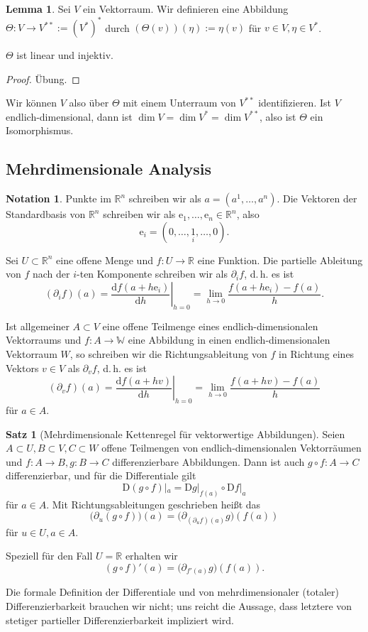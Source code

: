 \documentclass[a4paper]{scrreprt}
\numberwithin{equation}{chapter}
\newcommand{\D}{\mathrm{d}}
\newcommand{\DD}{\mathrm{D}}
\newcommand{\e}{\mathrm{e}}
\newcommand{\R}{\mathbb{R}}
\theoremstyle{definition}
\newtheorem{lemma}[defn]{Lemma}
\newtheorem{satz}[defn]{Satz}
\newtheorem{nota}[defn]{Notation}
\newcommand{\bewUeb}{\begin{proof}Übung.\end{proof}}
\begin{document}
\begin{lemma}
	Sei $V$ ein Vektorraum. Wir definieren eine Abbildung $\Theta\colon V \to V^{**} := (V^*)^*$ durch $(\Theta(v))(\eta) := \eta(v)$ für $v \in V, \eta \in V^*$.

	$\Theta$ ist linear und injektiv.

	\bewUeb
\end{lemma}
Wir können $V$ also über $\Theta$ mit einem Unterraum von $V^{**}$ identifizieren. Ist $V$ endlich-dimensional, dann ist $\dim V = \dim V^* = \dim V^{**}$, also ist $\Theta$ ein Isomorphismus.

\subsection{Mehrdimensionale Analysis}
\begin{nota}
	Punkte im $\mathbb R^n$ schreiben wir als $a = (a^1, \dots, a^n)$. Die Vektoren der Standardbasis von $\mathbb R^n$ schreiben wir als $\e_1, \dots, \e_n \in \mathbb R^n$, also \[\e_i = (0,\dots,\underset{i}{1},\dots,0).\]

	Sei $U \subset \mathbb R^n$ eine offene Menge und $f\colon U \to \mathbb R$ eine Funktion. Die partielle Ableitung von $f$ nach der $i$-ten Komponente schreiben wir als $\partial_i f$, d.\,h. es ist
	\[(\partial_i f)(a) = \left.\frac{\D f(a + h \e_i)}{\D h}\right|_{h=0} = \lim_{h\to 0} \frac{f(a + h \e_i) - f(a)}{h}.\]

	Ist allgemeiner $A \subset V$ eine offene Teilmenge eines endlich-dimensionalen Vektorraums und $f\colon A \to \mathbb W$ eine Abbildung in einen endlich-dimensionalen Vektorraum $W$, so schreiben wir die Richtungsableitung von $f$ in Richtung eines Vektors $v\in V$ als $\partial_v f$, d.\,h. es ist
	\[(\partial_v f)(a) = \left.\frac{\D f(a + h v)}{\D h}\right|_{h=0} = \lim_{h\to 0} \frac{f(a + h v) - f(a)}{h}\]
	für $a \in A$.
\end{nota}

\begin{satz}[Mehrdimensionale Kettenregel für vektorwertige Abbildungen]
	Seien $A \subset U, B \subset V, C \subset W$ offene Teilmengen von endlich-dimensionalen Vektorräumen und $f\colon A\to B, g\colon B \to C$ differenzierbare Abbildungen. Dann ist auch $g\circ f\colon A \to C$ differenzierbar, und für die Differentiale gilt
	\[\DD(g\circ f)|_a = \DD g|_{f(a)} \circ \DD f|_a\]
	für $a \in A$. Mit Richtungsableitungen geschrieben heißt das
	\[\Big(\partial_u(g\circ f)\Big)(a) = \Big(\partial_{(\partial_u f)(a)} g\Big)(f(a))\]
	für $u \in U, a\in A$.

	Speziell für den Fall $U = \R$ erhalten wir
	\[(g\circ f)'(a) = \Big(\partial_{f'(a)} g\Big)(f(a)).\]
\end{satz}
Die formale Definition der Differentiale und von mehrdimensionaler (totaler) Differenzierbarkeit brauchen wir nicht; uns reicht die Aussage, dass letztere von stetiger partieller Differenzierbarkeit impliziert wird.
\end{document}
